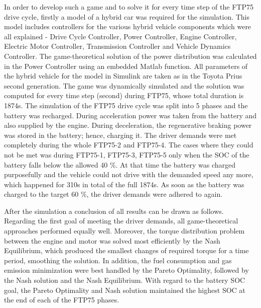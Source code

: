 In order to develop such a game and to solve it for every time step of the FTP75 drive cycle, firstly a model of a hybrid car was required for the simulation. This model includes controllers for the various hybrid vehicle components which were all explained - Drive Cycle Controller, Power Controller, Engine Controller, Electric Motor Controller, Transmission Controller and Vehicle Dynamics Controller. The game-theoretical solution of the power distribution was calculated in the Power Controller using an embedded Matlab function. All parameters of the hybrid vehicle for the model in Simulink are taken as in the Toyota Prius second generation. The game was dynamically simulated and the solution was computed for every time step (second) during FTP75, whose total duration is 1874s. The simulation of the FTP75 drive cycle was split into 5 phases and the battery was recharged. During acceleration power was taken from the battery and also supplied by the engine. During deceleration, the regenerative braking power was stored in the battery; hence, charging it. The driver demands were met completely during the whole FTP75-2 and FTP75-4. The cases where they could not be met was during FTP75-1, FTP75-3, FTP75-5 only when the SOC of the battery falls below the allowed 40 \%. At that time the battery was charged purposefully and the vehicle could not drive with the demanded speed any more, which happened for 310s in total of the full 1874s. As soon as the battery was charged to the target 60 \%, the driver demands were adhered to again.

After the simulation a conclusion of all results can be drawn as follows. Regarding the first goal of meeting the driver demands, all game-theoretical approaches performed equally well. Moreover, the torque distribution problem between the engine and motor was solved most efficiently by the Nash Equilibrium, which produced the smallest changes of required torque for a time period, smoothing the solution. In addition, the fuel consumption and gas emission minimization were best handled by the Pareto Optimality, followed by the Nash solution and the Nash Equilibrium. With regard to the battery SOC goal, the Pareto Optimality and Nash solution maintained the highest SOC at the end of each of the FTP75 phases.


